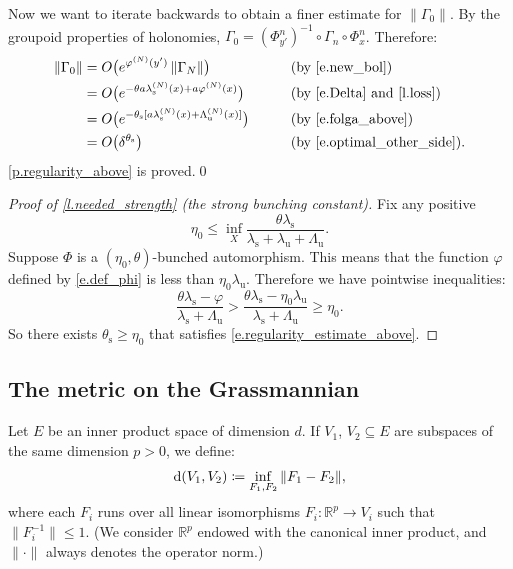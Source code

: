 \documentclass[JEP,XML,SOM,Unicode]{cedram}
\def\vcentcolon{\mathrel{\mathop\ordinarycolon}}
\providecommand\ordinarycolon{:}
\providecommand*\coloneqq{\vcentcolon\mathrel{\mkern-1.2mu}=}
\theoremstyle{plain}
\theoremstyle{definition}
\newcommand{\RR}{\mathbb{R}}
\newcommand{\dd}{\mathrm{d}}
\newcommand{\uu}{\mathrm{u}}
\renewcommand{\ss}{\mathrm{s}}
\let\phi\varphi
\begin{document}
Now we want to iterate backwards to obtain a finer estimate for $\| \Gamma_0 \|$.
By the groupoid properties of holonomies,
$\Gamma_0 = (\Phi^n_{y'})^{-1} \circ \Gamma_n \circ \Phi^n_x$.
Therefore:
\begin{alignat*}{2}
\|\Gamma_0\|
&= O \big( e^{\phi^{(N)}(y')} \, \| \Gamma_N \| \big)
&\qquad&\text{(by \eqref{e.new_bol})} \\
&= O \big( e^{-\theta a \lambda_\ss^{(N)}(x) + a \phi^{(N)}(x)} \big)
&\qquad&\text{(by \eqref{e.Delta} and \cref{l.loss})} \\
&= O \big( e^{-\theta_\ss [a \lambda_\ss^{(N)}(x) + \Lambda_\uu^{(N)}(x)]} \big)
&\qquad&\text{(by \eqref{e.folga_above})} \\
&= O \big( \delta^{\theta_\ss} \big)
&\qquad&\text{(by \eqref{e.optimal_other_side})}.
\end{alignat*}
\cref{p.regularity_above} is proved.\qed

\begin{proof}[Proof of \cref{l.needed_strength} (the strong bunching constant)]
Fix any positive
\begin{equation}\label{e.needed_strength}
\eta_0 \le \inf_X \frac{\theta \lambda_\ss}{\lambda_\ss + \lambda_\uu + \Lambda_\uu}.
\end{equation}
Suppose $\Phi$ is a $(\eta_0,\theta)$-bunched automorphism.
This means that the function $\phi$ defined by \eqref{e.def_phi} is less than $ \eta_0 \lambda_\uu$.
Therefore we have pointwise inequalities:
\[
\frac{\theta \lambda_\ss - \phi}{\lambda_\ss+\Lambda_\uu} > \frac{\theta \lambda_\ss - \eta_0 \lambda_\uu}{\lambda_\ss+\Lambda_\uu} \ge \eta_0.
\]
So there exists $\theta_\ss \ge \eta_0$ that satisfies \eqref{e.regularity_estimate_above}.
\end{proof}

\subsection{The metric on the Grassmannian}\label{ss.Grass}

Let $E$ be an inner product space of dimension $d$.
If $V_1$, $V_2 \subseteq E$ are subspaces of the same dimension $p>0$, we define:
\begin{equation}\label{e.def_metric}
\dd(V_1,V_2) \coloneqq \inf_{F_1, F_2} \| F_1 - F_2 \|,
\end{equation}
where each $F_i$ runs over all linear isomorphisms $F_i \colon \RR^p \to V_i$ such that $\|F_i^{-1}\| \le 1$.
(We consider $\RR^p$ endowed with the canonical inner product, and $\| \mathord{\cdot} \|$ always denotes the operator norm.)
\end{document}
